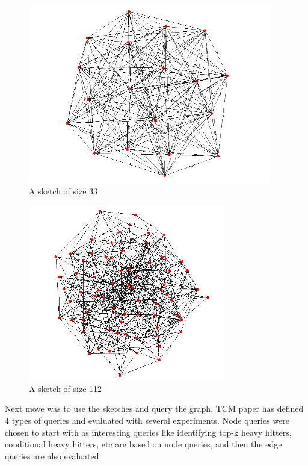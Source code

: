 \documentclass[12pt]{report}
\numberwithin{figure}{section}
\numberwithin{table}{section}
\begin{document}
\begin{figure}[H]
\centering
\includegraphics[scale=0.8]{images/s2}
\caption{A sketch of size 33}
\end{figure}

 

\begin{figure}[H]
\centering
\includegraphics[scale=0.8]{images/s3}
\caption{A sketch of size 112}
\end{figure}

Next move was to use the sketches and query the graph. TCM paper has defined 4 types of queries and evaluated with several experiments. Node queries were chosen to start with as interesting queries like identifying top-k heavy hitters\cite{HeavyHitters}, conditional heavy hitters\cite{TCM}, etc are based on node queries, and then the edge queries are also evaluated.

\paragraph{}
\end{document}
